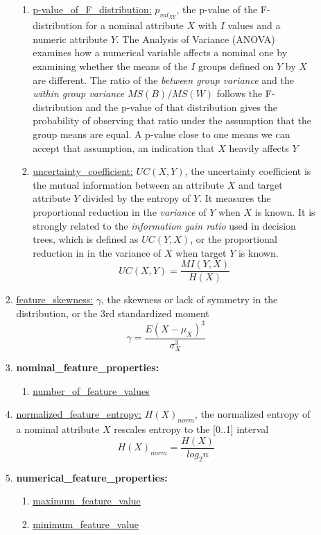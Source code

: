 \documentclass[a4paper,12pt, english]{article}
\begin{document}
\begin{enumerate}
\begin{enumerate}
\begin{enumerate}
\begin{enumerate}
				\item \underline{p-value\_of\_F\_distribution:} $p_{val_{XY}}$, the p-value of the F-distribution for a nominal attribute $X$ with $I$ values and a numeric attribute $Y$. The Analysis of Variance (ANOVA) examines how a numerical variable affects a nominal one by examining whether the means of the $I$ groups defined on $Y$ by $X$ are different. The ratio of the \emph{between group variance} and the \emph{within group variance} $MS(B)/MS(W)$ follows the F-distribution and the p-value of that distribution gives the probability of observing that ratio under the assumption that the group means are equal. A p-value close to one means we can accept that assumption, an indication that $X$ heavily affects $Y$
				\item \underline{uncertainty\_coefficient:} $UC(X,Y)$, the uncertainty coefficient is the mutual information between an attribute $X$ and target attribute $Y$ divided by the entropy of $Y$. It measures the proportional reduction in the \emph{variance} of $Y$ when $X$ is known. It is strongly related to the \emph{information gain ratio} used in decision trees, which is defined as $UC(Y,X)$, or the proportional reduction in in the variance of $X$ when target $Y$ is known. \begin{equation} UC(X,Y)=\frac{MI(Y,X)}{H(X)} \end{equation}
				\end{enumerate}			
			\item \underline{feature\_skewness:} $\gamma$, the skewness or lack of symmetry in the distribution, or the 3rd standardized moment \begin{equation} \gamma=\frac{E(X-\mu_{X})^{3}}{\sigma_{X}^{3}} \end{equation}
			\item \textbf{nominal\_feature\_properties:}
				\begin{enumerate}
				\item \underline{number\_of\_feature\_values}
				\end{enumerate}			
			\item \underline{normalized\_feature\_entropy:}  $H(X)_{norm}$, the normalized entropy of a nominal attribute $X$ rescales entropy to the [0..1] interval \begin{equation} H(X)_{norm}=\frac{H(X)}{log_{2}n} \end{equation} 
			\item \textbf{numerical\_feature\_properties:}
				\begin{enumerate}
				\item \underline{maximum\_feature\_value}
				\item \underline{minimum\_feature\_value}
				\end{enumerate}			
			\end{enumerate}		
		\end{enumerate}
	    
\end{enumerate}
\end{document}
